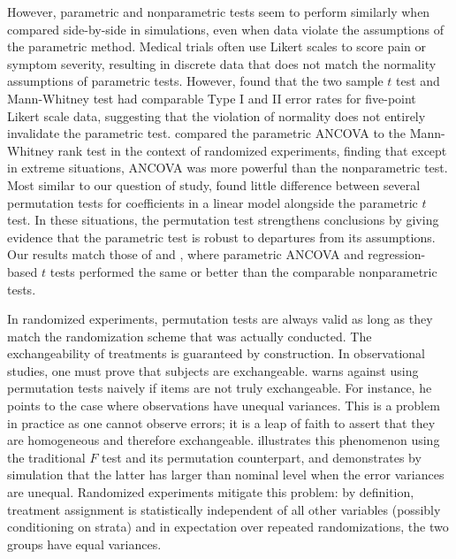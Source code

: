 \documentclass[12pt]{article}
\begin{document}
However, parametric and nonparametric tests seem to perform similarly when compared side-by-side in simulations, even when data violate the assumptions of the parametric method.
Medical trials often use Likert scales to score pain or symptom severity, resulting in discrete data that does not match the normality assumptions of parametric tests.
However, \cite{winter_five-point_2010} found that the two sample $t$ test and Mann-Whitney test had comparable Type I and II error rates for five-point Likert scale data, suggesting that the violation of normality does not entirely invalidate the parametric test.
\cite{vickers_parametric_2005} compared the parametric ANCOVA to the Mann-Whitney rank test in the context of randomized experiments, finding that except in extreme situations, ANCOVA was more powerful than the nonparametric test.
Most similar to our question of study, \cite{anderson_empirical_1999} found little difference between several permutation tests for coefficients in a linear model alongside the parametric $t$ test.
In these situations, the permutation test strengthens conclusions by giving evidence that the parametric test is robust to departures from its assumptions.
Our results match those of \citet{vickers_parametric_2005} and \citet{anderson_empirical_1999}, where parametric ANCOVA and regression-based $t$ tests performed the same or better than the comparable nonparametric tests.


In randomized experiments, permutation tests are always valid as long as they match the randomization scheme that was actually conducted.
The exchangeability of treatments is guaranteed by construction.
In observational studies, one must prove that subjects are exchangeable.
\cite{romano_behavior_1990} warns against using permutation tests naively if items are not truly exchangeable. 
For instance, he points to the case where observations have unequal variances.  
This is a problem in practice as one cannot observe errors; it is a leap of faith to assert that they are homogeneous and therefore exchangeable.
\cite{boik_fisherpitman_1987} illustrates this phenomenon using the traditional $F$ test and its permutation counterpart, 
and demonstrates by simulation that the latter has larger than nominal level when the error variances are unequal.
Randomized experiments mitigate this problem: by definition, treatment assignment is statistically independent of all other variables (possibly conditioning on strata) and in expectation over repeated randomizations, the two groups have equal variances.
\end{document}

